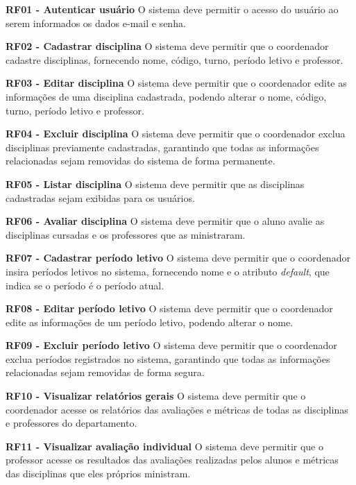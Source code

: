 \begin{description}
    \item \textbf{RF01 - Autenticar usuário}
        O sistema deve permitir o acesso do usuário ao serem informados os dados e-mail e senha.
        
    \item \textbf{RF02 - Cadastrar disciplina}
        O sistema deve permitir que o coordenador cadastre disciplinas, fornecendo nome, código, turno, período letivo e professor.
    
    \item \textbf{RF03 - Editar disciplina}
        O sistema deve permitir que o coordenador edite as informações de uma disciplina cadastrada, podendo alterar o nome, código, turno, período letivo e professor.

    \item \textbf{RF04 - Excluir disciplina}
        O sistema deve permitir que o coordenador exclua disciplinas previamente cadastradas, garantindo que todas as informações relacionadas sejam removidas do sistema de forma permanente.

    \item \textbf{RF05 - Listar disciplina}
        O sistema deve permitir que as disciplinas cadastradas sejam exibidas para os usuários.

    \item \textbf{RF06 - Avaliar disciplina}
        O sistema deve permitir que o aluno avalie as disciplinas cursadas e os professores que as ministraram.

    \item \textbf{RF07 - Cadastrar período letivo}
        O sistema deve permitir que o coordenador insira períodos letivos no sistema, fornecendo nome e o atributo \textit{default}, que indica se o período é o período atual.
    
    \item \textbf{RF08 - Editar período letivo}
        O sistema deve permitir que o coordenador edite as informações de um período letivo, podendo alterar o nome.

    \item \textbf{RF09 - Excluir período letivo}
       O sistema deve permitir que o coordenador exclua períodos registrados no sistema, garantindo que todas as informações relacionadas sejam removidas de forma segura.

    \item \textbf{RF10 - Visualizar relatórios gerais}
        O sistema deve permitir que o coordenador acesse os relatórios das avaliações e métricas de todas as disciplinas e professores do departamento.

    \item \textbf{RF11 - Visualizar avaliação individual}
        O sistema deve permitir que o professor acesse os resultados das avaliações realizadas pelos alunos e métricas das disciplinas que eles próprios ministram.
            
\end{description}
